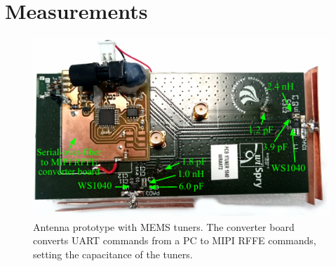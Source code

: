 \section{Measurements}
\label{sec:measurements}

\begin{figure}[H]
    \centering
    \includegraphics{img/meas/lassedouble}
    \caption{Antenna prototype with MEMS tuners. The converter board converts UART commands from a PC to MIPI RFFE commands, setting the capacitance of the tuners.}
    \label{fig:pcb}
\end{figure}
